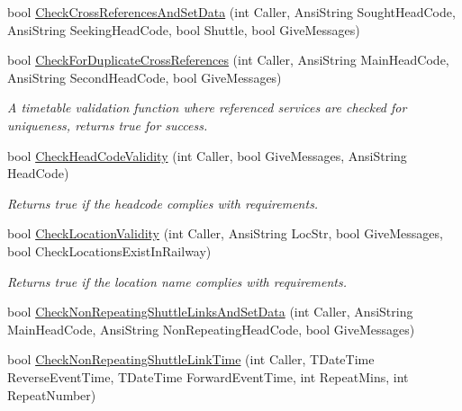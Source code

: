 \begin{DoxyCompactItemize}
bool \mbox{\hyperlink{class_t_train_controller_a72662be9ecd0e95131779bd10b6fe14f}{Check\+Cross\+References\+And\+Set\+Data}} (int Caller, Ansi\+String Sought\+Head\+Code, Ansi\+String Seeking\+Head\+Code, bool Shuttle, bool Give\+Messages)
\item 
\mbox{\label{class_t_train_controller_a232adcf919e3d70f2fc0cdc4d3bb2ee4}} 
bool \mbox{\hyperlink{class_t_train_controller_a232adcf919e3d70f2fc0cdc4d3bb2ee4}{Check\+For\+Duplicate\+Cross\+References}} (int Caller, Ansi\+String Main\+Head\+Code, Ansi\+String Second\+Head\+Code, bool Give\+Messages)
\begin{DoxyCompactList}\small\item\em A timetable validation function where referenced services are checked for uniqueness, returns true for success. \end{DoxyCompactList}\item 
\mbox{\label{class_t_train_controller_a1ccd6c8f2c24e7417889e1a91cb9ca2f}} 
bool \mbox{\hyperlink{class_t_train_controller_a1ccd6c8f2c24e7417889e1a91cb9ca2f}{Check\+Head\+Code\+Validity}} (int Caller, bool Give\+Messages, Ansi\+String Head\+Code)
\begin{DoxyCompactList}\small\item\em Returns true if the headcode complies with requirements. \end{DoxyCompactList}\item 
\mbox{\label{class_t_train_controller_a1925032d5e41decf4befc07b35521d3c}} 
bool \mbox{\hyperlink{class_t_train_controller_a1925032d5e41decf4befc07b35521d3c}{Check\+Location\+Validity}} (int Caller, Ansi\+String Loc\+Str, bool Give\+Messages, bool Check\+Locations\+Exist\+In\+Railway)
\begin{DoxyCompactList}\small\item\em Returns true if the location name complies with requirements. \end{DoxyCompactList}\item 
bool \mbox{\hyperlink{class_t_train_controller_aa991976bc8ea956f9e9230f6a6921ac1}{Check\+Non\+Repeating\+Shuttle\+Links\+And\+Set\+Data}} (int Caller, Ansi\+String Main\+Head\+Code, Ansi\+String Non\+Repeating\+Head\+Code, bool Give\+Messages)
\item 
bool \mbox{\hyperlink{class_t_train_controller_a45168500acc985a1573602e0c00a0d9a}{Check\+Non\+Repeating\+Shuttle\+Link\+Time}} (int Caller, T\+Date\+Time Reverse\+Event\+Time, T\+Date\+Time Forward\+Event\+Time, int Repeat\+Mins, int Repeat\+Number)

\end{DoxyCompactItemize}
